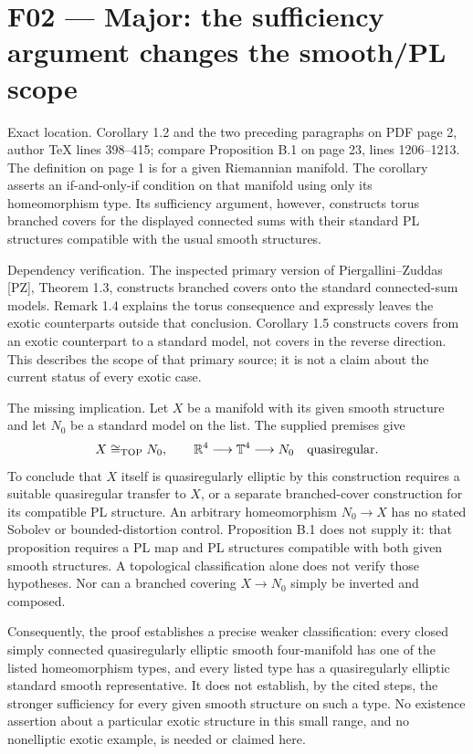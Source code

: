 \documentclass[10pt]{article}
\begin{document}
\section*{F02 — Major: the sufficiency argument changes the smooth/PL scope}
Exact location. Corollary 1.2 and the two preceding paragraphs on PDF page 2, author TeX lines 398–415; compare Proposition B.1 on page 23, lines 1206–1213. The definition on page 1 is for a given Riemannian manifold. The corollary asserts an if-and-only-if condition on that manifold using only its homeomorphism type. Its sufficiency argument, however, constructs torus branched covers for the displayed connected sums with their standard PL structures compatible with the usual smooth structures.\par
Dependency verification. The inspected primary version of Piergallini–Zuddas [PZ], Theorem 1.3, constructs branched covers onto the standard connected-sum models. Remark 1.4 explains the torus consequence and expressly leaves the exotic counterparts outside that conclusion. Corollary 1.5 constructs covers from an exotic counterpart to a standard model, not covers in the reverse direction. This describes the scope of that primary source; it is not a claim about the current status of every exotic case.\par
The missing implication. Let \(X\) be a manifold with its given smooth structure and let \(N_0\) be a standard model on the list. The supplied premises give \[X\cong_{\mathrm{TOP}}N_0,\qquad
 \mathbb R^4\longrightarrow\mathbb T^4\longrightarrow N_0
 \quad\hbox{quasiregular}.\] To conclude that \(X\) itself is quasiregularly elliptic by this construction requires a suitable quasiregular transfer to \(X\), or a separate branched-cover construction for its compatible PL structure. An arbitrary homeomorphism \(N_0\to X\) has no stated Sobolev or bounded-distortion control. Proposition B.1 does not supply it: that proposition requires a PL map and PL structures compatible with both given smooth structures. A topological classification alone does not verify those hypotheses. Nor can a branched covering \(X\to N_0\) simply be inverted and composed.\par
Consequently, the proof establishes a precise weaker classification: every closed simply connected quasiregularly elliptic smooth four-manifold has one of the listed homeomorphism types, and every listed type has a quasiregularly elliptic standard smooth representative. It does not establish, by the cited steps, the stronger sufficiency for every given smooth structure on such a type. No existence assertion about a particular exotic structure in this small range, and no nonelliptic exotic example, is needed or claimed here.\par
\end{document}

